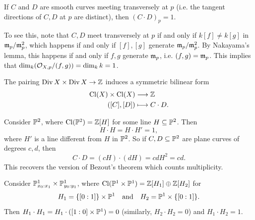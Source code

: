 \begin{remark}
  If $C$ and $D$ are smooth
  curves meeting transversely at
  $p$ (i.e. the tangent directions of
  $C, D$ at $p$ are
  distinct), then
  $(C \cdot D)_p = 1$.

  To see this, note that $C, D$ meet
  transversely at $p$ if and only if
  $k[f] \ne k[g]$ in
  $\mathfrak{m}_p / \mathfrak{m}_p^2$, which happens if and only
  if $[f], [g]$ generate
  $\mathfrak{m}_p / \mathfrak{m}_p^2$. By Nakayama's lemma,
  this happens if and only if
  $f, g$ generate $\mathfrak{m}_p$, i.e.
  $(f, g) = \mathfrak{m}_p$. This implies that
  $\dim_k (\mathcal{O}_{X, p} / (f, g)) = \dim_k k = 1$.
\end{remark}

\begin{remark}
  The pairing $\operatorname{Div} X \times \operatorname{Div} X \to \mathbb{Z}$
  induces a symmetric bilinear
  form
  \begin{align*}
    \operatorname{Cl}(X) \times \operatorname{Cl}(X) &\longrightarrow \mathbb{Z} \\
    ([C], [D]) &\longmapsto C \cdot D.
  \end{align*}
\end{remark}

\begin{example}
  Consider $\mathbb{P}^2$, where
  $\operatorname{Cl}(\mathbb{P}^2) = \mathbb{Z}[H]$ for some line
  $H \subseteq \mathbb{P}^2$.
  Then
  \[
    H \cdot H
    = H \cdot H'
    = 1,
  \]
  where $H'$ is a line different
  from $H$ in $\mathbb{P}^2$.
  So if $C, D \subseteq \mathbb{P}^2$ are
  plane curves of degrees $c, d$, then
  \[
    C \cdot D
    = (cH) \cdot (dH)
    = cd H^2 = cd.
  \]
  This recovers the version of
  Bezout's theorem which
  counts multiplicity.
\end{example}

\begin{example}
  Consider $\mathbb{P}^1_{x_0 : x_1} \times \mathbb{P}^1_{y_0 : y_1}$,
  where $\operatorname{Cl}(\mathbb{P}^1 \times \mathbb{P}^1) = \mathbb{Z}[H_1] \oplus \mathbb{Z}[H_2]$
  for
  \[
    H_1 = \{[0 : 1]\} \times \mathbb{P}^1
    \quad \text{and} \quad
    H_2 = \mathbb{P}^1 \times \{[0 : 1]\}.
  \]
  Then $H_1 \cdot H_1 = H_1 \cdot ([1 : 0] \times \mathbb{P}^1) = 0$
  (similarly, $H_2 \cdot H_2 = 0$) and
  $H_1 \cdot H_2 = 1$.
\end{example}

